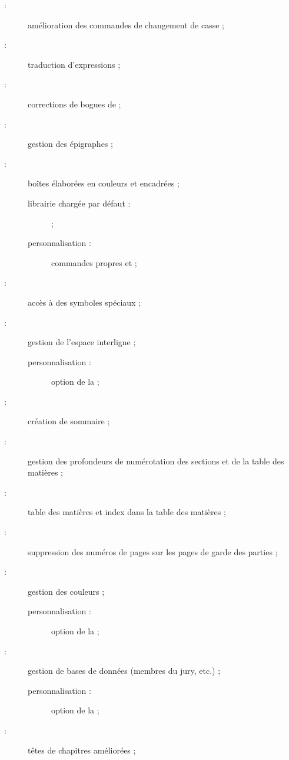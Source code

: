 \begin{description}
\item[ :] amélioration des commandes de changement de
  casse ;
\item[ :] traduction d'expressions ;
\item[ :] corrections de bogues de  ;
\item[ :] gestion des épigraphes ;
\item[ :] boîtes élaborées en couleurs et encadrées ;
  \begin{description}
  \item[librairie chargée par défaut :]  ;
  \item[personnalisation :] commandes propres  et
     ;
  \end{description}
\item[ :] accès à des symboles spéciaux ;
\item[ :] gestion de l'espace interligne ;
  \begin{description}
  \item[personnalisation :] option de la \yatcl {} ;
  \end{description}
\item[ :] création de sommaire ;
\item[ :] gestion des profondeurs de numérotation des
  sections et de la table des matières ;
\item[ :] table des matières et index dans la table des
  matières ;
\item[ :] suppression des numéros de pages sur les pages
  de garde des parties ;
\item[ :] gestion des couleurs ;
  \begin{description}
  \item[personnalisation :] option de la \yatcl {} ;
  \end{description}
\item[ :] gestion de bases de données (membres du jury,
  etc.) ;
  \begin{description}
  \item[personnalisation :] option de la \yatcl {} ;
  \end{description}
\item[ :] têtes de chapitres améliorées ;

\end{description}

